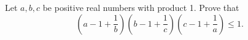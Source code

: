 Let $a, b, c$ be positive real numbers with product 1. Prove that
\[ \left(a - 1 + \frac{1}{b}\right)\left(b - 1 + \frac{1}{c}\right)\left(c - 1 + \frac{1}{a}\right) \leq 1. \]
